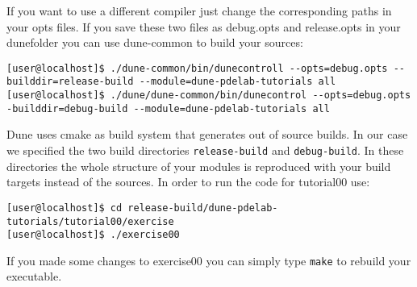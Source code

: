 \documentclass[12pt,a4paper]{article}
\begin{document}



If you want to use a different compiler just change the corresponding
paths in your opts files.  If you save these two files as debug.opts
and release.opts in your dunefolder you can use dune-common to build
your sources:

\begin{lstlisting}
[user@localhost]$ ./dune-common/bin/dunecontroll --opts=debug.opts --builddir=release-build --module=dune-pdelab-tutorials all
[user@localhost]$ ./dune/dune-common/bin/dunecontrol --opts=debug.opts -builddir=debug-build --module=dune-pdelab-tutorials all
\end{lstlisting}
Dune uses cmake as build system that generates out of source builds.
In our case we specified the two build directories
\lstinline{release-build} and \lstinline{debug-build}.  In these
directories the whole structure of your modules is reproduced with
your build targets instead of the sources.  In order to run the
code for tutorial00 use:
\begin{lstlisting}
[user@localhost]$ cd release-build/dune-pdelab-tutorials/tutorial00/exercise
[user@localhost]$ ./exercise00
\end{lstlisting}
 If you made some changes to exercise00
 you can simply type \lstinline{make} to rebuild
your executable.
\end{document}
